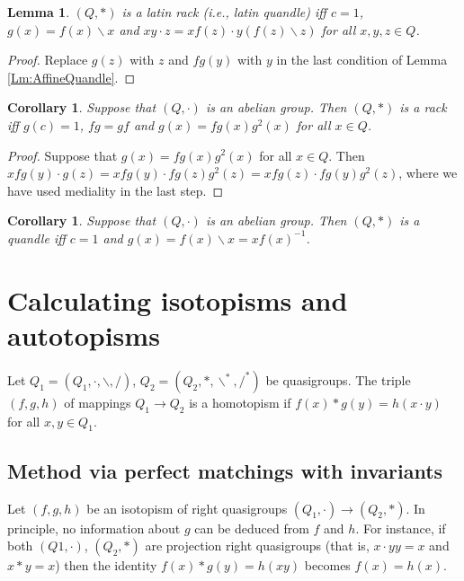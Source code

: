 \documentclass{amsart}
\def\rdiv{/}
\def\ldiv{\backslash}
\def\isordiv{/^*}
\def\isoldiv{\backslash^*}
\theoremstyle{plain}
\newtheorem{corollary}[theorem]{Corollary}
\newtheorem{lemma}[theorem]{Lemma}
\theoremstyle{definition}
\begin{document}
\begin{lemma}\label{Lm:AffineLatinQuandle}
$(Q,*)$ is a latin rack (i.e., latin quandle) iff $c=1$, $g(x)=f(x)\ldiv x$ and $xy\cdot z = xf(z)\cdot y(f(z)\ldiv z)$ for all $x,y,z\in Q$.
\end{lemma}
\begin{proof}
Replace $g(z)$ with $z$ and $fg(y)$ with $y$ in the last condition of Lemma \ref{Lm:AffineQuandle}.
\end{proof}

\begin{corollary}
Suppose that $(Q,\cdot)$ is an abelian group. Then $(Q,*)$ is a rack iff $g(c)=1$, $fg=gf$ and $g(x)=fg(x)g^2(x)$ for all $x\in Q$.
\end{corollary}
\begin{proof}
Suppose that $g(x)=fg(x)g^2(x)$ for all $x\in Q$. Then $xfg(y)\cdot g(z) = xfg(y)\cdot fg(z)g^2(z) =  xfg(z)\cdot fg(y)g^2(z)$, where we have used mediality in the last step.
\end{proof}

\begin{corollary}
Suppose that $(Q,\cdot)$ is an abelian group. Then $(Q,*)$ is a quandle iff $c=1$ and $g(x)=f(x)\ldiv x = xf(x)^{-1}$.
\end{corollary}

\section{Calculating isotopisms and autotopisms}

Let $Q_1 = (Q_1,\cdot,\ldiv,\rdiv)$, $Q_2=(Q_2,*,\isoldiv,\isordiv)$ be quasigroups. The triple $(f,g,h)$ of mappings $Q_1\to Q_2$ is a homotopism if $f(x)*g(y) = h(x\cdot y)$ for all $x,y\in Q_1$.

\subsection{Method via perfect matchings with invariants}

Let $(f,g,h)$ be an isotopism of right quasigroups $(Q_1,\cdot)\to (Q_2,*)$. In principle, no information about $g$ can be deduced from $f$ and $h$. For instance, if both $(Q1,\cdot)$, $(Q_2,*)$ are projection right quasigroups (that is, $x\cdot y y = x$ and $x*y=x$) then the identity $f(x)*g(y)=h(xy)$ becomes $f(x)=h(x)$.
\end{document}
